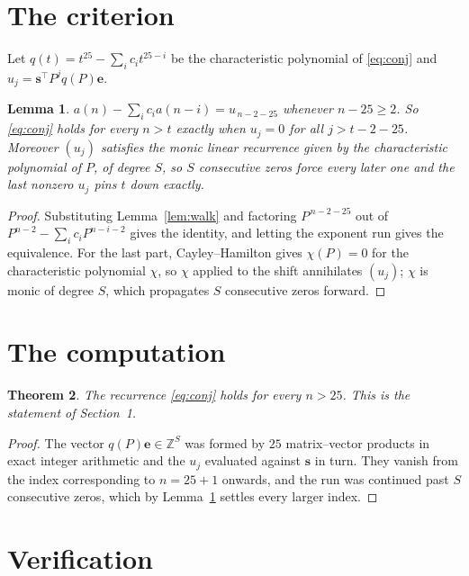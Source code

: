 \documentclass[11pt,a4paper]{article}
\theoremstyle{plain}
\newtheorem{theorem}{Theorem}
\newtheorem{lemma}[theorem]{Lemma}
\theoremstyle{definition}
\begin{document}
\section{The criterion}

Let $q(t)=t^{25}-\sum_i c_i t^{25-i}$ be the characteristic polynomial of
\eqref{eq:conj} and $u_j=\mathbf{s}^{\!\top}P^{j}q(P)\mathbf{e}$.

\begin{lemma}\label{lem:crit}
$a(n)-\sum_i c_i a(n-i)=u_{\,n-2-25}$ whenever $n-25\ge2$. So \eqref{eq:conj}
holds for every $n>t$ exactly when $u_j=0$ for all $j>t-2-25$. Moreover $(u_j)$
satisfies the monic linear recurrence given by the characteristic polynomial of $P$, of
degree $S$, so $S$ consecutive zeros force every later one and the last nonzero $u_j$ pins
$t$ down exactly.
\end{lemma}

\begin{proof}
Substituting Lemma~\ref{lem:walk} and factoring $P^{\,n-2-25}$ out of
$P^{n-2}-\sum_i c_i P^{n-i-2}$ gives the identity, and letting the exponent run gives the
equivalence. For the last part, Cayley--Hamilton gives $\chi(P)=0$ for the characteristic
polynomial $\chi$, so $\chi$ applied to the shift annihilates $(u_j)$; $\chi$ is monic of
degree $S$, which propagates $S$ consecutive zeros forward.
\end{proof}

\section{The computation}

\begin{theorem}
The recurrence \eqref{eq:conj} holds for every $n>25$. This is the statement of
Section~1.
\end{theorem}

\begin{proof}
The vector $q(P)\mathbf{e}\in\mathbb{Z}^{S}$ was formed by $25$ matrix--vector
products in exact integer arithmetic and the $u_j$ evaluated against $\mathbf{s}$ in turn.
They vanish from the index corresponding to $n=25+1$ onwards, and the run was continued
past $S$ consecutive zeros, which by Lemma~\ref{lem:crit} settles every larger index.
\end{proof}

\section{Verification}
\end{document}
